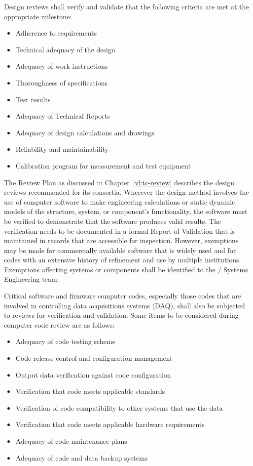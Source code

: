 Design reviews shall verify and validate that the following criteria
are met at the appropriate milestone:
\begin{itemize}
 \item Adherence to requirements
 \item Technical adequacy of the design
 \item Adequacy of work instructions
 \item Thoroughness of specifications
 \item Test results
 \item Adequacy of Technical Reports
 \item Adequacy of design calculations and drawings
 \item Reliability and maintainability
 \item Calibration program for measurement and test equipment
\end{itemize}

The  Review Plan as discussed in
Chapter~\ref{vl:tc-review} describes the design reviews recommended
for its consortia.  Wherever the design method involves the use of
computer software to make engineering calculations or static dynamic
models of the structure, system, or component's functionality, the
software must be verified to demonstrate that the software produces
valid results. The verification needs to be documented in a formal
Report of Validation that is maintained in records that are accessible
for inspection. However, exemptions may be made for commercially
available software that is widely used and for codes with an extensive
history of refinement and use by multiple institutions. Exemptions
affecting systems or components shall be identified to the
/ Systems Engineering team.

Critical software and firmware computer codes, especially those codes
that are involved in controlling  data acquisitions systems (DAQ),
shall also be subjected to reviews for verification and
validation. Some items to be considered during computer code review
are as follows:
\begin{itemize}
 \item Adequacy of code testing scheme
 \item Code release control and configuration management
 \item Output data verification against code configuration
 \item Verification that code meets applicable standards
 \item Verification of code compatibility to other systems that use the data
 \item Verification that code meets applicable hardware requirements
 \item Adequacy of code maintenance plans
 \item Adequacy of code and data backup systems
\end{itemize}

